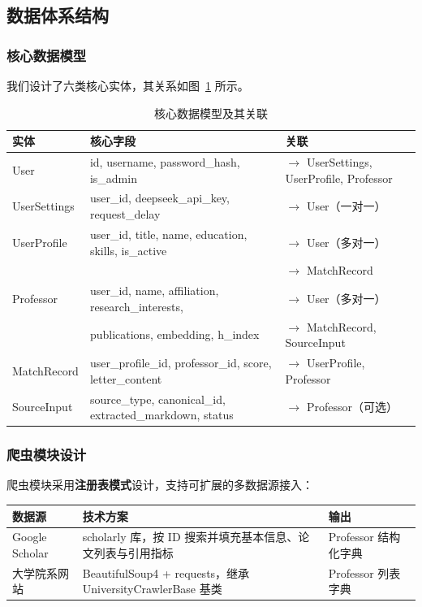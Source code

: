 \documentclass[11pt]{article}
\begin{document}
\subsection{数据体系结构}

\subsubsection{核心数据模型}

我们设计了六类核心实体，其关系如图~\ref{fig:er} 所示。

\begin{table}[htbp]
\centering
\small
\begin{tabular}{p{2.2cm}p{5cm}p{5.3cm}}
\toprule
\textbf{实体} & \textbf{核心字段} & \textbf{关联} \\
\midrule
User & id, username, password\_hash, is\_admin & $\rightarrow$ UserSettings, UserProfile, Professor \\
UserSettings & user\_id, deepseek\_api\_key, request\_delay & $\rightarrow$ User（一对一） \\
UserProfile & user\_id, title, name, education, skills, is\_active & $\rightarrow$ User（多对一） \\
& & $\rightarrow$ MatchRecord \\
Professor & user\_id, name, affiliation, research\_interests, & $\rightarrow$ User（多对一） \\
& publications, embedding, h\_index & $\rightarrow$ MatchRecord, SourceInput \\
MatchRecord & user\_profile\_id, professor\_id, score, letter\_content & $\rightarrow$ UserProfile, Professor \\
SourceInput & source\_type, canonical\_id, extracted\_markdown, status & $\rightarrow$ Professor（可选） \\
\bottomrule
\end{tabular}
\caption{核心数据模型及其关联}
\label{fig:er}
\end{table}

\subsubsection{爬虫模块设计}

爬虫模块采用\textbf{注册表模式}设计，支持可扩展的多数据源接入：

\begin{center}
\small
\begin{tabular}{lp{4.5cm}p{3.5cm}}
\toprule
\textbf{数据源} & \textbf{技术方案} & \textbf{输出} \\
\midrule
Google Scholar & scholarly 库，按 ID 搜索并填充基本信息、论文列表与引用指标 & Professor 结构化字典 \\
大学院系网站 & BeautifulSoup4 + requests，继承 UniversityCrawlerBase 基类 & Professor 列表字典 \\
\bottomrule
\end{tabular}
\end{center}
\end{document}

